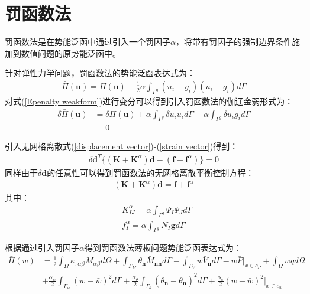 \section{罚函数法}
罚函数法\cite{}是在势能泛函中通过引入一个罚因子$\alpha$，将带有罚因子的强制边界条件施加到数值问题的原势能泛函中。\par
针对弹性力学问题，罚函数法的势能泛函表达式为：
\begin{equation}\label{Epenalty weakform}
\begin{split}
    \bar{\Pi}(\pmb{u})=\Pi(\pmb{u})+\frac{1}{2}\alpha\int_{\Gamma^g}(u_i-g_i)(u_i-g_i)d\Gamma
\end{split}
\end{equation}
对式(\ref{Epenalty weakform})进行变分可以得到引入罚函数法的伽辽金弱形式为：
\begin{equation}
\begin{split}
    \delta\bar{\Pi}(\pmb{u})&=\delta\Pi(\pmb{u})+\alpha\int_{\Gamma^g}\delta u_iu_id\Gamma-\alpha\int_{\Gamma^g}\delta u_ig_id\Gamma\\
    &=0
\end{split}                                                 
\end{equation}\par
引入无网格离散式(\ref{displacement vector})-(\ref{strain vector})得到：
\begin{equation}
\begin{split}
      \delta\pmb{d}^T\{(\pmb{K}+\pmb{K}^{\alpha})\pmb{d}-(\pmb{f}+\pmb{f}^{\alpha})\}=0
\end{split}                                                 
\end{equation}
同样由于$\delta\pmb{d}$的任意性可以得到罚函数法的无网格离散平衡控制方程：
\begin{equation}
\begin{split}
    (\pmb{K}+\pmb{K}^{\alpha})\pmb{d}=\pmb{f}+\pmb{f}^{\alpha}
\end{split}
\end{equation}
其中：
\begin{equation}
\begin{split}
  &K^{\alpha}_{IJ}=\alpha\int_{\Gamma^g}\Psi_I\Psi_Jd\Gamma\\
  &f^{\alpha}_I=\alpha\int_{\Gamma^g}N_I\pmb{g}d\Gamma
\end{split}
\end{equation}\par
根据\cite{}通过引入罚因子$\alpha$得到罚函数法薄板问题势能泛函表达式为：
\begin{equation}\label{Ppenalty}
\begin{split}
        \bar{\Pi}(w)&=\frac{1}{2}\int_{\Omega}\kappa_{,\alpha\beta}M_{\alpha\beta}d\Omega+\int_{\Gamma_M}\theta_{\pmb{n}}\bar{M}_{\pmb{nn}}d\Gamma-\int_{\Gamma_V}w\bar{V}_{\pmb{n}}d\Gamma-w\bar{P}\vert_{x\in c_P}+\int_{\Omega}w\bar{q}d\Omega\\
    &+\frac{\alpha_w}{2}\int_{\Gamma_w}(w-\bar{w})^2d\Gamma+\frac{\alpha_{\theta}}{2}\int_{\Gamma_{\theta}}(\theta_{\pmb{n}}-\bar{\theta}_{\pmb{n}})^2d\Gamma+\frac{\alpha_c}{2}(w-\bar{w})^2\vert_{x\in c_w}
\end{split}
\end{equation}
